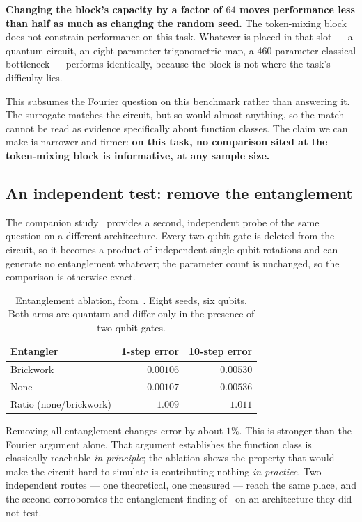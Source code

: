 \documentclass[11pt,onecolumn]{article}
\newif\ifdraft
\newcommand{\pend}[1]{%
  \ifdraft\textcolor{PendFG}{\textbf{[}\textit{#1}\textbf{]}}\fi}
\begin{document}
\textbf{Changing the block's capacity by a factor of $64$ moves
performance less than half as much as changing the random seed.} The
token-mixing block does not constrain performance on this task. Whatever
is placed in that slot --- a quantum circuit, an eight-parameter
trigonometric map, a $460$-parameter classical bottleneck --- performs
identically, because the block is not where the task's difficulty lies.

This subsumes the Fourier question on this benchmark rather than
answering it. The surrogate matches the circuit, but so would almost
anything, so the match cannot be read as evidence specifically about
function classes. The claim we can make is narrower and firmer:
\textbf{on this task, no comparison sited at the token-mixing block is
informative, at any sample size.}
\pend{run the surrogate sweep on the Ising task, where
Section~\ref{sec:sensitivity} establishes that capacity binds at the
model level, though not specifically at this block}

\subsection{An independent test: remove the entanglement}
\label{sec:entanglement}
The companion study~\cite{paperb} provides a second, independent probe
of the same question on a different architecture. Every two-qubit gate
is deleted from the circuit, so it becomes a product of independent
single-qubit rotations and can generate no entanglement whatever; the
parameter count is unchanged, so the comparison is otherwise exact.

\begin{table}[htb]\centering\small
\caption{Entanglement ablation, from~\cite{paperb}. Eight seeds, six
qubits. Both arms are quantum and differ only in the presence of
two-qubit gates.}
\begin{tabular}{lrr}
\toprule
Entangler & 1-step error & 10-step error \\
\midrule
Brickwork & $0.00106$ & $0.00530$ \\
None      & $0.00107$ & $0.00536$ \\
\midrule
Ratio (none/brickwork) & $1.009$ & $1.011$ \\
\bottomrule
\end{tabular}
\end{table}

Removing all entanglement changes error by about $1\%$. This is stronger
than the Fourier argument alone. That argument establishes the
function class is classically reachable \emph{in principle}; the
ablation shows the property that would make the circuit hard to simulate
is contributing nothing \emph{in practice}. Two independent routes --- one
theoretical, one measured --- reach the same place, and the second
corroborates the entanglement finding of~\cite{bowles2024} on an
architecture they did not test.
\end{document}
